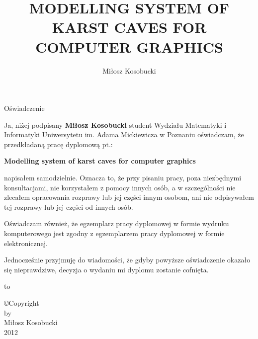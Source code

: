 \documentclass[twoside,openright,a4paper]{memoir}
\begin{document}
\title{MODELLING SYSTEM OF KARST CAVES FOR COMPUTER GRAPHICS}
\author{Miłosz Kosobucki}

\maketitle
\newpage

\begin{center}
  \LARGE{Oświadczenie}
\end{center}

Ja, niżej podpisany \textbf{Miłosz Kosobucki} student Wydziału
Matematyki i Informatyki Uniwersytetu im. Adama Mickiewicza w Poznaniu
oświadczam, że przedkładaną pracę dyplomową pt.:

\textbf{Modelling system of karst caves for computer graphics}

napisałem samodzielnie. Oznacza to, że przy pisaniu pracy, poza niezbędnymi
konsultacjami, nie korzystałem z pomocy innych osób, a w szczególności nie
zlecałem opracowania rozprawy lub jej części innym osobom, ani nie
odpisywałem tej rozprawy lub jej części od innych osób.

Oświadczam również, że egzemplarz pracy dyplomowej w formie wydruku
komputerowego jest zgodny z egzemplarzem pracy dyplomowej w formie
elektronicznej.

Jednocześnie przyjmuję do wiadomości, że gdyby powyższe oświadczenie
okazało się nieprawdziwe, decyzja o wydaniu mi dyplomu zostanie cofnięta.

\newcommand{\kropki}[2]{%
  \vbox{%
    \hbox to #1{\dotfill}%
    \vspace{4pt}%
    \hbox to #1{\hss #2\hss}%
  }
}
\vspace{1cm}
\hbox to \textwidth{%
  \hfil
  \kropki{4cm}{data}%
  \hfil\hfil
  \kropki{4cm}{podpis}%
  \hfil
}%
\newpage

\copyright Copyright\\
by\\
Miłosz Kosobucki\\
2012

\tableofcontents









\printbibliography
\end{document}
